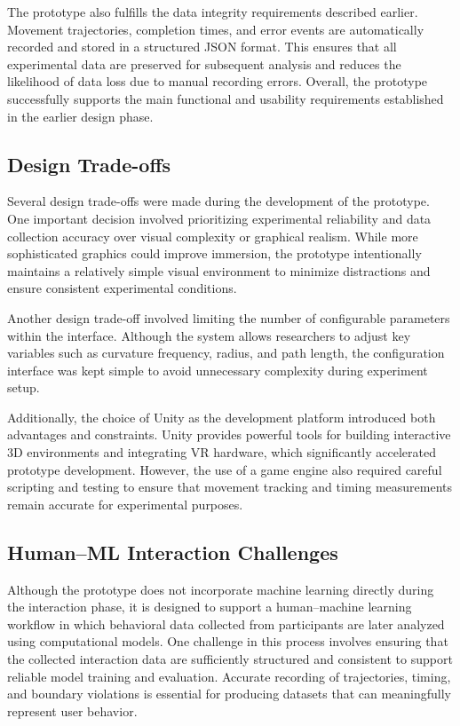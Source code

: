 \documentclass[sigconf]{acmart}
\begin{document}
The prototype also fulfills the data integrity requirements described earlier. Movement trajectories, completion times, and error events are automatically recorded and stored in a structured JSON format. This ensures that all experimental data are preserved for subsequent analysis and reduces the likelihood of data loss due to manual recording errors. Overall, the prototype successfully supports the main functional and usability requirements established in the earlier design phase.

\subsection{Design Trade-offs}

Several design trade-offs were made during the development of the prototype. One important decision involved prioritizing experimental reliability and data collection accuracy over visual complexity or graphical realism. While more sophisticated graphics could improve immersion, the prototype intentionally maintains a relatively simple visual environment to minimize distractions and ensure consistent experimental conditions.

Another design trade-off involved limiting the number of configurable parameters within the interface. Although the system allows researchers to adjust key variables such as curvature frequency, radius, and path length, the configuration interface was kept simple to avoid unnecessary complexity during experiment setup.

Additionally, the choice of Unity as the development platform introduced both advantages and constraints. Unity provides powerful tools for building interactive 3D environments and integrating VR hardware, which significantly accelerated prototype development. However, the use of a game engine also required careful scripting and testing to ensure that movement tracking and timing measurements remain accurate for experimental purposes.

\subsection{Human--ML Interaction Challenges}

Although the prototype does not incorporate machine learning directly during the interaction phase, it is designed to support a human--machine learning workflow in which behavioral data collected from participants are later analyzed using computational models. One challenge in this process involves ensuring that the collected interaction data are sufficiently structured and consistent to support reliable model training and evaluation. Accurate recording of trajectories, timing, and boundary violations is essential for producing datasets that can meaningfully represent user behavior.
\end{document}
